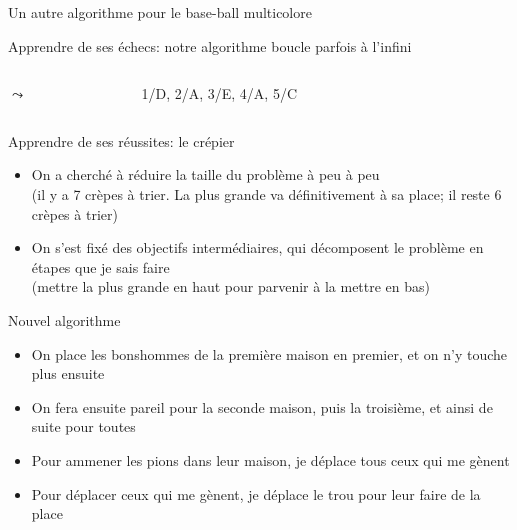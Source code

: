 \documentclass[final,hyperref={pdfpagelabels=false}]{beamer}
\renewenvironment{Coupe}{   }{   }
\renewcommand*{\Large}{\fontsize{\resultLargeX}{\resultLargeY}\selectfont}
\begin{document}
\begin{Coupe}
\begin{frame}{Un autre algorithme pour le base-ball multicolore}
\begin{block}{Apprendre de ses échecs: {\color{black}notre algorithme boucle parfois à l'infini}}
\begin{columns}
      \begin{column}{.1\linewidth}\center
        \Large$\leadsto$
      \end{column}

      \begin{column}{.2\linewidth}\center
                    {1/D, 2/A, 3/E, 4/A, 5/C}
      \end{column}
      \begin{column}{.2\linewidth}
        ~
      \end{column}
    \end{columns}
  \end{block}

  \bigskip

  \begin{block}{Apprendre de ses réussites: {\color{black}le crépier}}
    \begin{itemize}\vspace{-.2\baselineskip}
    \item On a cherché à réduire la taille du problème à peu à peu\\
      {(il y a 7 crèpes à trier. La plus grande va définitivement à sa place; il
        reste 6 crèpes à trier)}
    \item On s'est fixé des objectifs intermédiaires, qui décomposent le
      problème en étapes que je sais faire\\
      {(mettre la plus grande en haut pour parvenir à la mettre en bas)}
    \end{itemize}
  \end{block}

  \begin{block}{Nouvel algorithme}
    \begin{itemize}\vspace{-.2\baselineskip}
    \item On place les bonshommes de la première maison en premier, et on n'y
      touche plus ensuite
    \item On fera ensuite pareil pour la seconde maison, puis la troisième, et
      ainsi de suite pour toutes
    \item Pour ammener les pions  dans leur maison, je déplace tous
      ceux qui me gènent
    \item Pour déplacer ceux qui me gènent, je déplace le trou pour leur faire de
      la place
    \end{itemize}
  \end{block}
  


\end{frame}
\end{Coupe}
\end{document}
